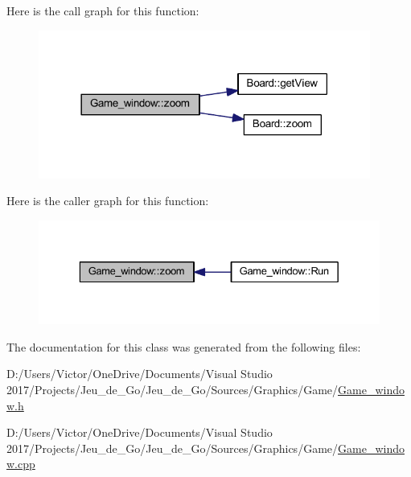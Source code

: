 Here is the call graph for this function\+:
\nopagebreak
\begin{figure}[H]
\begin{center}
\leavevmode
\includegraphics[width=309pt]{class_game__window_a9b9b15469cb0ced1a22f28e447983b56_cgraph}
\end{center}
\end{figure}
Here is the caller graph for this function\+:
\nopagebreak
\begin{figure}[H]
\begin{center}
\leavevmode
\includegraphics[width=329pt]{class_game__window_a9b9b15469cb0ced1a22f28e447983b56_icgraph}
\end{center}
\end{figure}


The documentation for this class was generated from the following files\+:\begin{DoxyCompactItemize}
\item 
D\+:/\+Users/\+Victor/\+One\+Drive/\+Documents/\+Visual Studio 2017/\+Projects/\+Jeu\+\_\+de\+\_\+\+Go/\+Jeu\+\_\+de\+\_\+\+Go/\+Sources/\+Graphics/\+Game/\hyperlink{_game__window_8h}{Game\+\_\+window.\+h}\item 
D\+:/\+Users/\+Victor/\+One\+Drive/\+Documents/\+Visual Studio 2017/\+Projects/\+Jeu\+\_\+de\+\_\+\+Go/\+Jeu\+\_\+de\+\_\+\+Go/\+Sources/\+Graphics/\+Game/\hyperlink{_game__window_8cpp}{Game\+\_\+window.\+cpp}\end{DoxyCompactItemize}
